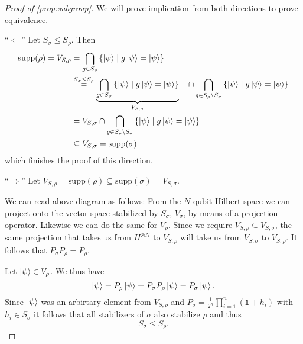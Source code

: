 \begin{proof}[Proof of \cref{prop:subgroup}]
  We will prove implication from both directions to prove equivalence.

  \enquote{$\Leftarrow$} Let $S_\sigma \leq S_\rho$. Then
  \begin{align*}
    \mathrm{supp}(\rho) = V_{S,\rho} &= \bigcap_{g\in S_\rho} \left\{ \ket{\psi} \mid
    g\ket{\psi} = \ket{\psi} \right\} \\
        &\overset{S_\sigma \leq S_\rho}{=} \underbrace{\bigcap_{g\in S_\sigma}
        \left\{\ket{\psi} \mid g \ket{\psi} =
        \ket{\psi}\right\}}_{V_{S,\sigma}}\ \ \ \cap \bigcap_{g \in S_\rho \setminus
        S_\sigma} \left\{\ket{\psi} \mid g \ket{\psi} =
        \ket{\psi}\right\}\\
        &= V_{S,\sigma} \cap \bigcap_{g \in S_\rho \setminus
        S_\sigma} \left\{\ket{\psi} \mid g \ket{\psi} =
        \ket{\psi}\right\}\\
        &\subseteq V_{S,\sigma} = \mathrm{supp}(\sigma)
  .\end{align*}
  which finishes the proof of this direction.

  \enquote{$\Rightarrow$} Let $V_{S,\rho} = \mathrm{supp}(\rho) \subseteq
  \mathrm{supp}(\sigma) = V_{S,\sigma}$. 

  \begin{figure}[htpb]
    \centering
\end{figure}

  We can read above diagram as follows: From the $N$-qubit Hilbert space we can
  project onto the vector space stabilized by $S_\sigma$, $V_\sigma$, by means of a
  projection operator. Likewise we can do the same for $V_\rho$. Since we
  require $V_{S,\rho} \subseteq V_{S,\sigma}$, the same projection that takes
  us from $H^{\otimes N}$ to $V_{S,\rho}$ will take us from $V_{S,\sigma}$ to
  $V_{S,\rho}$. It follows that $P_\sigma P_\rho = P_\rho$.

  Let $\ket{\psi} \in V_\rho$. We thus have
  \[
    \ket{\psi} = P_\rho \ket{\psi} = P_\sigma P_\rho \ket{\psi} = P_\sigma
    \ket{\psi}.
  \]
  Since $\ket{\psi}$ was an arbirtary element from $V_{S,\rho}$ and $P_\sigma =
  \frac{1}{2^n} \prod_{i=1}^n \left(\mathds{1} + h_i\right)$ with $h_i \in
  S_\sigma$ it follows that all stabilizers of $\sigma$ also stabilize $\rho$
  and thus
  \[
    S_\sigma \leq S_\rho.
  \]


\end{proof}
